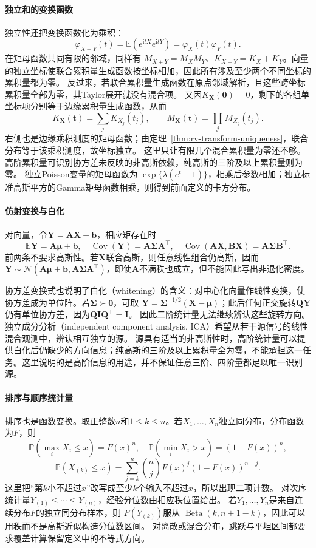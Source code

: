 \paragraph{独立和的变换函数}
独立性还把变换函数化为乘积：
\[
\varphi_{X+Y}(t)=\mathbb E(e^{\mathrm itX}e^{\mathrm itY})
=\varphi_X(t)\varphi_Y(t).
\]
在矩母函数共同有限的邻域，同样有
\(M_{X+Y}=M_XM_Y\)、\(K_{X+Y}=K_X+K_Y\)。向量的独立坐标使联合累积量生成函数按坐标相加，因此所有涉及至少两个不同坐标的累积量都为零。
反过来，若联合累积量生成函数在原点邻域解析，且这些跨坐标累积量全部为零，其Taylor展开就没有混合项。
又因\(K_{\bm X}(\bm0)=0\)，剩下的各组单坐标项分别等于边缘累积量生成函数，从而
\[
 K_{\bm X}(\bm t)=\sum_jK_{X_j}(t_j),\qquad
 M_{\bm X}(\bm t)=\prod_jM_{X_j}(t_j).
\]
右侧也是边缘乘积测度的矩母函数；由定理~\ref{thm:rv-transform-uniqueness}，联合分布等于该乘积测度，故坐标独立。
这里只让有限几个混合累积量为零还不够。高阶累积量可识别协方差未反映的非高斯依赖，纯高斯的三阶及以上累积量则为零。
独立Poisson变量的矩母函数为
\(\exp\{\lambda(e^t-1)\}\)，相乘后参数相加；独立标准高斯平方的Gamma矩母函数相乘，则得到前面定义的卡方分布。

\paragraph{仿射变换与白化}
对向量，令\(\bm Y=\bm A\bm X+\bm b\)，相应矩存在时
\[
\mathbb E\bm Y=\bm A\bm\mu+\bm b,\quad
\operatorname{Cov}(\bm Y)=\bm A\bm\Sigma\bm A^\top,\quad
\operatorname{Cov}(\bm A\bm X,\bm B\bm X)=\bm A\bm\Sigma\bm B^\top.
\]
前两条不要求高斯性。若\(\bm X\)联合高斯，则任意线性组合仍高斯，因而
\(\bm Y\sim\mathcal N(\bm A\bm\mu+\bm b,\bm A\bm\Sigma\bm A^\top)\)，即使\(\bm A\)不满秩也成立，但不能因此写出非退化密度。

协方差变换式也说明了白化（whitening）的含义：对中心化向量作线性变换，使协方差成为单位阵。若\(\bm\Sigma\succ\bm0\)，可取
\(\bm Y=\bm\Sigma^{-1/2}(\bm X-\bm\mu)\)；此后任何正交旋转\(\bm Q\bm Y\)仍有单位协方差，因为\(\bm Q\bm I\bm Q^\top=\bm I\)。
因此二阶统计量无法继续辨认这些旋转方向。独立成分分析（independent component analysis, ICA）希望从若干源信号的线性混合观测中，辨认相互独立的源。
源具有适当的非高斯性时，高阶统计量可以提供白化后仍缺少的方向信息；纯高斯的三阶及以上累积量全为零，不能承担这一任务。这里说明的是高阶信息的用途，并不保证任意三阶、四阶量都足以唯一识别源。

\paragraph{排序与顺序统计量}
排序也是函数变换。取正整数\(n\)和\(1\leq k\leq n\)。若\(X_1,\ldots,X_n\)独立同分布，分布函数为\(F\)，则
\[
\mathbb P(\max_iX_i\leq x)=F(x)^n,\quad
\mathbb P(\min_iX_i>x)=(1-F(x))^n,
\]
\[
\mathbb P(X_{(k)}\leq x)
=\sum_{j=k}^n\binom njF(x)^j(1-F(x))^{n-j}.
\]
这里把“第\(k\)小不超过\(x\)”改写成至少\(k\)个输入不超过\(x\)，所以出现二项计数。
对次序统计量\(Y_{(1)}\leq\cdots\leq Y_{(n)}\)，经验分位数由相应秩位置给出。
若\(Y_1,\ldots,Y_n\)是来自连续分布\(F\)的独立同分布样本，则
\(F(Y_{(k)})\)服从
\(\operatorname{Beta}(k,n+1-k)\)，因此可以用秩而不是高斯近似构造分位数区间。
对离散或混合分布，跳跃与平坦区间都要求覆盖计算保留定义中的不等式方向。

